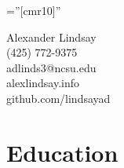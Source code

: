 \documentclass[a4paper,10pt]{article} %
\begin{document}
\pagestyle{empty} %

\font\fb=''[cmr10]'' %



\begin{center}
\Large Alexander Lindsay\\
\normalsize (425) 772-9375\\
adlinds3@ncsu.edu\\
alexlindsay.info\\
github.com/lindsayad\\
\end{center}




\section{Education}
\end{document}
